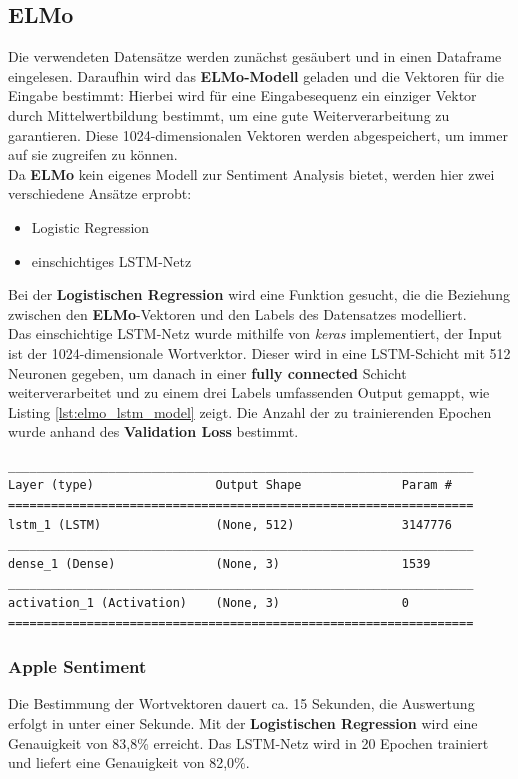 \subsection{ELMo}
Die verwendeten Datens\"atze werden zun\"achst ges\"aubert und in einen Dataframe eingelesen. Daraufhin wird das \textbf{ELMo-Modell} geladen und die Vektoren f\"ur die Eingabe bestimmt: Hierbei wird f\"ur eine Eingabesequenz ein einziger Vektor durch Mittelwertbildung bestimmt, um eine gute Weiterverarbeitung zu garantieren. Diese 1024-dimensionalen Vektoren werden abgespeichert, um immer auf sie zugreifen zu k\"onnen.\\
Da \textbf{ELMo} kein eigenes Modell zur Sentiment Analysis bietet, werden hier zwei verschiedene Ans\"atze erprobt:
\begin{itemize}
\item Logistic Regression
\item einschichtiges LSTM-Netz
\end{itemize}
Bei der \textbf{Logistischen Regression} wird eine Funktion gesucht, die die Beziehung zwischen den \textbf{ELMo}-Vektoren und den Labels des Datensatzes modelliert.\\
Das einschichtige LSTM-Netz wurde mithilfe von \textit{keras} implementiert, der Input ist der 1024-dimensionale Wortverktor. Dieser wird in eine LSTM-Schicht mit 512 Neuronen gegeben, um danach in einer \textbf{fully connected} Schicht weiterverarbeitet und zu einem drei Labels umfassenden Output gemappt, wie Listing \ref{lst:elmo_lstm_model} zeigt. Die Anzahl der zu trainierenden Epochen wurde anhand des \textbf{Validation Loss} bestimmt.
\lstset{language=Python}
\lstset{frame=lines}
\lstset{captionpos=b}
\lstset{basicstyle=\footnotesize}
\begin{lstlisting}
_________________________________________________________________
Layer (type)                 Output Shape              Param #   
=================================================================
lstm_1 (LSTM)                (None, 512)               3147776   
_________________________________________________________________
dense_1 (Dense)              (None, 3)                 1539      
_________________________________________________________________
activation_1 (Activation)    (None, 3)                 0         
=================================================================
\end{lstlisting}

\subsubsection*{Apple Sentiment}
Die Bestimmung der Wortvektoren dauert ca. 15 Sekunden, die Auswertung erfolgt in unter einer Sekunde. Mit der \textbf{Logistischen Regression} wird eine Genauigkeit von 83,8\% erreicht. Das LSTM-Netz wird in 20 Epochen trainiert und liefert eine Genauigkeit von 82,0\%.

